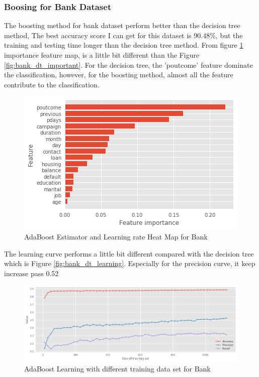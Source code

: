 \documentclass[10pt, conference, compsocconf]{IEEEtran}
\begin{document}
\subsubsection{Boosing for Bank Dataset}
The boosting method for bank dataset perform better than the decision tree method, The best accuracy score I can get for this dataset is 90.48\%, but the training and testing time longer than the decision tree method. From figure \ref{fig:bank_abd_important} importance feature map, is a little bit different than the Figure \ref{fig:bank_dt_important}. For the decision tree, the 'poutcome' feature dominate the classification, however, for the boosting method, almost all the feature contribute to the classification. 
\begin{figure}[h]
	\centering
	\includegraphics[scale = 0.5]{image/bank_abd_important.png}
	\caption{AdaBoost Estimator and Learning rate Heat Map for Bank}
	\label{fig:bank_abd_important}
\end{figure}

The learning curve performs a little bit different compared with the decision tree which is Figure \ref{fig:bank_dt_learning}. Especially for the precision curve, it keep increase pass 0.52

\begin{figure}[h]
	\centering
	\includegraphics[scale = 0.25]{image/bank_abd_learning.png}
	\caption{AdaBoost Learning with different training data set for Bank}
	\label{fig:bank_abd_learing}
\end{figure}
\end{document}
